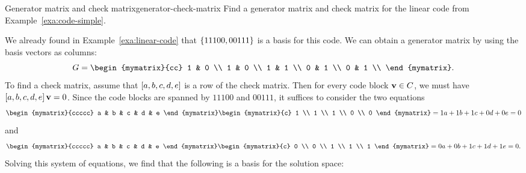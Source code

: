 \begin{example}{Generator matrix and check matrix}{generator-check-matrix}
  Find a generator matrix and check matrix for the linear code from
  Example~\ref{exa:code-simple}.
\end{example}

\begin{solution}
  We already found in Example~\ref{exa:linear-code} that
  $\left\{11100, 00111\right\}$ is a basis for this code. We can obtain a
  generator matrix by using the basis vectors as columns:
  \begin{equation*}
    G = \begin{mymatrix}{cc}
      1 & 0 \\
      1 & 0 \\
      1 & 1 \\
      0 & 1 \\
      0 & 1 \\
    \end{mymatrix}.
  \end{equation*}
  To find a check matrix, assume that $\left[a,b,c,d,e\right]$ is a row of
  the check matrix. Then for every code block $\mbox{\bf v}\in C$, we must
  have $\left[a,b,c,d,e\right]\mbox{\bf v}=0$. Since the code blocks are spanned
  by $11100$ and $00111$, it suffices to consider the two equations
  \begin{equation*}
    \begin{mymatrix}{ccccc} a & b & c & d & e \end{mymatrix}
    \begin{mymatrix}{c} 1 \\ 1 \\ 1 \\ 0 \\ 0 \end{mymatrix}
    = 1a+1b+1c+0d+0e = 0
  \end{equation*}
  and
  \begin{equation*}
    \begin{mymatrix}{ccccc} a & b & c & d & e \end{mymatrix}
    \begin{mymatrix}{c} 0 \\ 0 \\ 1 \\ 1 \\ 1 \end{mymatrix}
    = 0a+0b+1c+1d+1e = 0.
  \end{equation*}
  Solving this system of equations, we find that the following is a
  basis for the solution space:

\end{solution}
